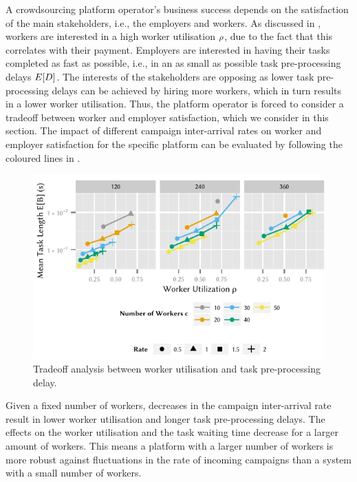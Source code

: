 A crowdsourcing platform operator's business success depends on the satisfaction of the main stakeholders, i.e., the employers and workers.
As discussed in , workers are interested in a high worker utilisation \(\rho\), due to the fact that this correlates with their payment.
Employers are interested in having their tasks completed as fast as possible, i.e., in an as small as possible task pre-processing delays \(E[D]\).
The interests of the stakeholders are opposing as lower task pre-processing delays can be achieved by hiring more workers, which in turn results in a lower worker utilisation.
Thus, the platform operator is forced to consider a tradeoff between worker and employer satisfaction, which we consider in this section.
The impact of different campaign inter-arrival rates on worker and employer satisfaction for the specific platform can be evaluated by following the coloured lines in .

\begin{figure}
	\centering
	\includegraphics{cloud/crowdsourcing/numerical_evaluation/figures/pareto}
	\caption{Tradeoff analysis between worker utilisation and task pre-processing delay.}
	\label{fig:cloud:crowdsourcing:performance_evaluation:tradeoff:pareto}
\end{figure}

Given a fixed number of workers, decreases in the campaign inter-arrival rate result in lower worker utilisation and longer task pre-processing delays.
The effects on the worker utilisation and the task waiting time decrease for a larger amount of workers.
This means a platform with a larger number of workers is more robust against fluctuations in the rate of incoming campaigns than a system with a small number of workers.

